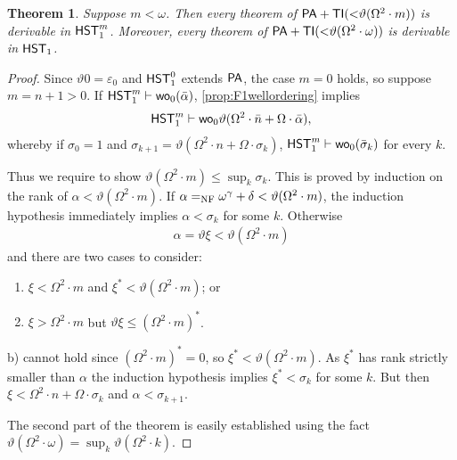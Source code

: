\documentclass[UKenglish,cleveref,DIV=12]{scrartcl}
\newtheorem{theorem}{Theorem}
\newtheorem{corollary}[lemma]{Corollary}
\theoremstyle{definition}
\theoremstyle{definition}
\begin{document}
\begin{theorem}\label{cor:F1lowerbound}\label{thm:F1lowerbound}
Suppose $m<\omega$. Then every theorem of
$\mathsf{PA}+\mathsf{TI}(\mathord<\vartheta(\Omega^2\cdot m))$  is derivable in
$\mathsf{HST}_1^{m}$. Moreover, every theorem of
$\mathsf{PA}+\mathsf{TI}(\mathord<\vartheta(\Omega^2\cdot \omega))$ is derivable in
$\mathsf{HST}_1$.
\end{theorem}
\begin{proof}
Since $\vartheta0=\varepsilon_0$ and $\mathsf{HST}_1^0$ extends $\mathsf{PA}$, the case
$m=0$ holds, so suppose $m=n+1>0$. If $\mathsf{HST}_1^m\vdash \mathsf{wo}_0(\bar\alpha)$,
\cref{prop:F1wellordering} implies
\begin{align*}
 \mathsf{HST}_1^{m}\vdash \mathsf{wo}_0 \vartheta(\Omega^2\cdot \bar n+\Omega\cdot\bar\alpha),
\end{align*}
whereby if $\sigma_0=1$ and $\sigma_{k+1}=\vartheta(\Omega^2\cdot n+\Omega\cdot\sigma_k)$, $\mathsf{HST}_1^m\vdash \mathsf{wo}_0(\bar\sigma_k)$ for every $k$.

Thus we require to show $\vartheta(\Omega^2\cdot m)\le\sup_k\sigma_k$. This
is proved by induction on the rank of $\alpha<\vartheta(\Omega^2\cdot
m)$. If $\alpha=_{\mathrm{NF}}\omega^\gamma+\delta<\vartheta(\Omega^2\cdot m)$, the induction
hypothesis immediately implies $\alpha<\sigma_k$ for some $k$. Otherwise
\begin{align*}
 \alpha=\vartheta\xi<\vartheta(\Omega^2\cdot m)
\end{align*}
and there are two cases to consider:
\begin{enumerate}%
 \item $\xi<\Omega^2\cdot m$ and $\xi^*<\vartheta(\Omega^2\cdot m)$; or
 \item $\xi>\Omega^2\cdot m$ but $\vartheta\xi\le(\Omega^2\cdot m)^*$.
\end{enumerate}
b) cannot hold since $(\Omega^2\cdot m)^*=0$, so $\xi^*<\vartheta(\Omega^2\cdot m)$. As $\xi^*$ has rank strictly
smaller than $\alpha$ the induction hypothesis
implies $\xi^*<\sigma_k$ for some $k$. But then $\xi<\Omega^2\cdot n+\Omega\cdot\sigma_k$ and
$\alpha<\sigma_{k+1}$.

The second part of the theorem is easily established using the fact $\vartheta(\Omega^2\cdot\omega)=\sup_k\vartheta(\Omega^2\cdot k)$.
\end{proof}
\end{document}
